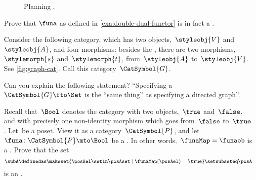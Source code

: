 \begin{figure*}[h!]
    \centering
    \caption{Planning .}
    \label{fig:plans_functor}
\end{figure*}

\vfill
\clearpage
\vfill

\begin{gradedexercise}
    \label{ex:DoubleDualFunctor}
    Prove that $\funa$ as defined in \cref{exa:double-dual-functor} is in fact a .
\end{gradedexercise}

\begin{marginfigure}
    \centering
    \caption{}
    \label{fig:graph-cat}
\end{marginfigure}

\begin{gradedexercise}
    \label{ex:GraphsViaFunctors}
    Consider the following category, which has two objects,~$\styleobj{V}$ and~$\styleobj{A}$, and four morphisms: besides the , there are two morphisms,~$\stylemorph{s}$ and~$\stylemorph{t}$, from~$\styleobj{A}$ to~$\styleobj{V}$.
    See \cref{fig:graph-cat}.
    Call this category~$\CatSymbol{G}$.

    Can you explain the following statement?
    ``Specifying a ~$\CatSymbol{G} \fto \Set$ is the ``same thing'' as specifying a directed graph''.
\end{gradedexercise}

\begin{gradedexercise}
    \label{ex:UpperSetsViaFunctors}
    Recall that~$\Bool$ denotes the category with two objects,~$\true$ and~$\false$, and with precisely one non-identity morphism which goes from~$\false$ to~$\true$.
    Let~\posA be a poset.
    View it as a category~$\CatSymbol{P}$, and let~$\funa \colon \CatSymbol{P} \mto \Bool$ be a .
    In other words,~$\funaMap = \funaob$ is a .
    Prove that the set
    \begin{equation}
        \subA \definedas \makeset{ \posAel \setin \posAset \mid \funaMap(\posAel) = \true } \setsubseteq \posA
    \end{equation}
    is an .
\end{gradedexercise}

